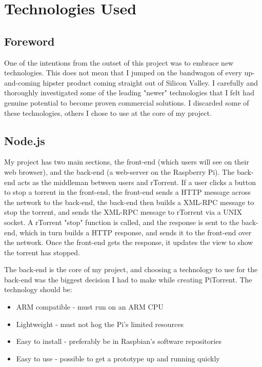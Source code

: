 \chapter{Technologies Used} 

\label{Chapter2} 



\section{Foreword}
One of the intentions from the outset of this project was to embrace new technologies. This does not mean that I jumped on the bandwagon of every up-and-coming hipster product coming straight out of Silicon Valley. I carefully and thoroughly investigated some of the leading "newer" technologies that I felt had genuine potential to become proven commercial solutions. I discarded some of these technologies, others I chose to use at the core of my project. 


\section{Node.js}
My project has two main sections, the front-end (which users will see on their web browser), and the back-end (a web-server on the Raspberry Pi). The back-end acts as the middleman between users and rTorrent. If a user clicks a button to stop a torrent in the front-end, the front-end sends a HTTP message across the network to the back-end, the back-end then builds a XML-RPC message to stop the torrent, and sends the XML-RPC message to rTorrent via a UNIX socket. A rTorrent "stop" function is called, and the response is sent to the back-end, which in turn builds a HTTP response, and sends it to the front-end over the network. Once the front-end gets the response, it updates the view to show the torrent has stopped.

The back-end is the core of my project, and choosing a technology to use for the back-end was the biggest decision I had to make while creating PiTorrent. The technology should be:

\begin{itemize}
	\item ARM compatible - must run on an ARM CPU
	\item Lightweight - must not hog the Pi's limited resources
	\item Easy to install - preferably be in Raspbian's software repositories 
	\item Easy to use - possible to get a prototype up and running quickly
\end{itemize}

